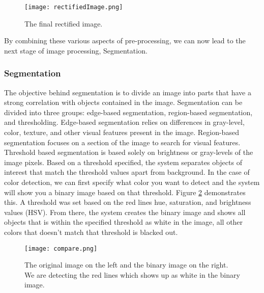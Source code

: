 \documentclass[12pt]{article}
\begin{document}
\begin{figure}[htp!]
	\begin{center}
		\texttt{[image: rectifiedImage.png]}
		\caption{The final rectified image.}  \label{fig.rect}
	\end{center}
\end{figure}

By combining these various aspects of pre-processing, we can now lead to the next stage of image processing, Segmentation.


\subsubsection{Segmentation}

The objective behind segmentation is to divide an image into parts that have a strong correlation with objects contained in the image. Segmentation can be divided into three groups: edge-based segmentation, region-based segmentation, and thresholding. Edge-based segmentation relies on differences in gray-level, color, texture, and other visual features present in the image. Region-based segmentation focuses on a section of the image to search for visual features. Threshold based segmentation is based solely on brightness or gray-levels of the image pixels. Based on a threshold specified, the system separates objects of interest that match the threshold values apart from background. In the case of color detection, we can first specify what color you want to detect and the system will show you a binary image based on that threshold. Figure \ref{fig.compare} demonstrates this. A threshold was set based on the red lines hue, saturation, and brightness values (HSV). From there, the system creates the binary image and shows all objects that is within the specified threshold as white in the image, all other colors that doesn't match that threshold is blacked out.


\begin{figure}[htp!]
	\begin{center}
		\texttt{[image: compare.png]}
		\caption{The original image on the left and the binary image on the right. We are detecting the red lines which shows up as white in the binary image.}  \label{fig.compare}
	\end{center}
\end{figure}
\end{document}
